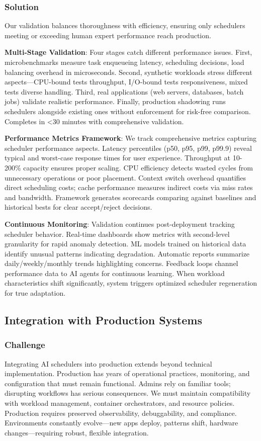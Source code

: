 \subsubsection{Solution}
Our validation balances thoroughness with efficiency, ensuring only schedulers meeting or exceeding human expert performance reach production.

\textbf{Multi-Stage Validation}: Four stages catch different performance issues. First, microbenchmarks measure task enqueueing latency, scheduling decisions, load balancing overhead in microseconds. Second, synthetic workloads stress different aspects—CPU-bound tests throughput, I/O-bound tests responsiveness, mixed tests diverse handling. Third, real applications (web servers, databases, batch jobs) validate realistic performance. Finally, production shadowing runs schedulers alongside existing ones without enforcement for risk-free comparison. Completes in <30 minutes with comprehensive validation.

\textbf{Performance Metrics Framework}: We track comprehensive metrics capturing scheduler performance aspects. Latency percentiles (p50, p95, p99, p99.9) reveal typical and worst-case response times for user experience. Throughput at 10-200\% capacity ensures proper scaling. CPU efficiency detects wasted cycles from unnecessary operations or poor placement. Context switch overhead quantifies direct scheduling costs; cache performance measures indirect costs via miss rates and bandwidth. Framework generates scorecards comparing against baselines and historical bests for clear accept/reject decisions.

\textbf{Continuous Monitoring}: Validation continues post-deployment tracking scheduler behavior. Real-time dashboards show metrics with second-level granularity for rapid anomaly detection. ML models trained on historical data identify unusual patterns indicating degradation. Automatic reports summarize daily/weekly/monthly trends highlighting concerns. Feedback loops channel performance data to AI agents for continuous learning. When workload characteristics shift significantly, system triggers optimized scheduler regeneration for true adaptation.

\subsection{Integration with Production Systems}

\subsubsection{Challenge}
Integrating AI schedulers into production extends beyond technical implementation. Production has years of operational practices, monitoring, and configuration that must remain functional. Admins rely on familiar tools; disrupting workflows has serious consequences. We must maintain compatibility with workload management, container orchestrators, and resource policies. Production requires preserved observability, debuggability, and compliance. Environments constantly evolve—new apps deploy, patterns shift, hardware changes—requiring robust, flexible integration.

